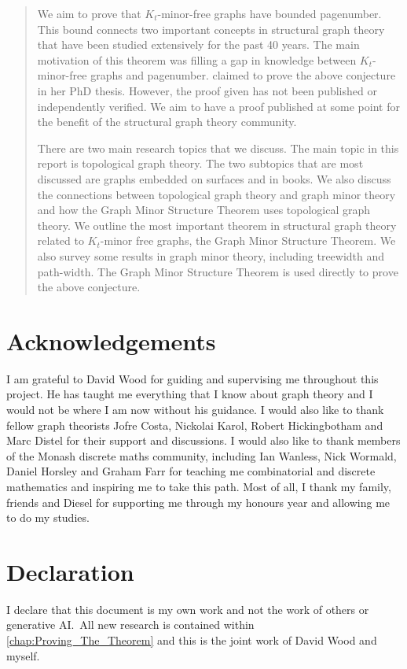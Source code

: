 \begin{abstract}
	We aim to prove that \(K_t\)-minor-free graphs have bounded pagenumber. This bound connects two important concepts in structural graph theory that have been studied extensively for the past 40 years. The main motivation of this theorem was filling a gap in knowledge between $K_t$-minor-free graphs and pagenumber. \textcite{Blankenship-PhD03} claimed to prove the above conjecture in her PhD thesis. However, the proof given has not been published or independently verified. We aim to have a proof published at some point for the benefit of the structural graph theory community. 

	There are two main research topics that we discuss.
	The main topic in this report is topological graph theory. The two subtopics that are most discussed are graphs embedded on surfaces and in books. We also discuss the connections between topological graph theory and graph minor theory and how the Graph Minor Structure Theorem uses topological graph theory. 
	We outline the most important theorem in structural graph theory related to \(K_t\)-minor free graphs, the Graph Minor Structure Theorem. We also survey some results in graph minor theory, including treewidth and path-width. The Graph Minor Structure Theorem is used directly to prove the above conjecture. 
\end{abstract}
\newpage

\section{Acknowledgements}
I am grateful to David Wood for guiding and supervising me throughout this project. He has taught me everything that I know about graph theory and I would not be where I am now without his guidance. I would also like to thank fellow graph theorists Jofre Costa, Nickolai Karol, Robert Hickingbotham and Marc Distel for their support and discussions. I would also like to thank members of the Monash discrete maths community, including Ian Wanless, Nick Wormald, Daniel Horsley and Graham Farr for teaching me combinatorial and discrete mathematics and inspiring me to take this path. Most of all, I thank my family, friends and Diesel for supporting me through my honours year and allowing me to do my studies.

\section{Declaration}

I declare that this document is my own work and not the work of others or generative AI.\ All new research is contained within \cref{chap:Proving_The_Theorem} and this is the joint work of David Wood and myself.